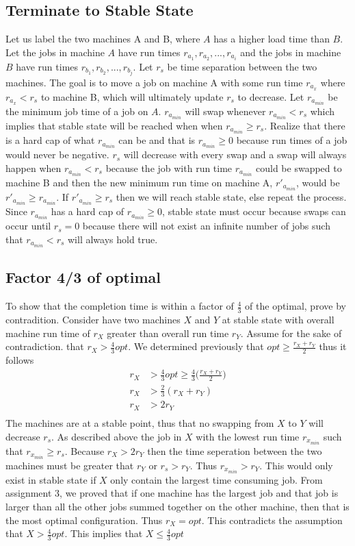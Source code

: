 \documentclass[11pt]{article}
\begin{document}
\subsection*{Terminate to Stable State}
 Let us label the two machines A and B, where $A$ has a higher load time than $B$. Let the jobs in machine $A$ have run times $r_{a_1}, r_{a_2}, ..., r_{a_i}$ and the jobs in machine $B$ have run times $r_{b_1}, r_{b_2}, ..., r_{b_j}$. Let $r_s$ be time separation between the two machines. The goal is to move a job on machine A with some run time $r_{a_x}$ where $r_{a_x} < r_s$ to machine B,  which will ultimately update $r_s$ to decrease. Let $r_{a_{min}}$ be the minimum job time of a job on $A$. $r_{a_{min}}$ will swap whenever $r_{a_{min}} < r_s$ which implies that stable state will be reached when when $r_{a_{min}} \geq r_s$. Realize that there is a hard cap of what $r_{a_{min}}$ can be and that is $r_{a_{min}} \geq 0$ because run times of a job would never be negative. $r_s$ will decrease with every swap and a swap will always happen when $r_{a_{min}} < r_s$ because the job with run time $r_{a_{min}}$ could be swapped to machine B and then the new minimum run time on machine A, $r'_{a_{min}}$, would be $r'_{a_{min}} \geq r_{a_{min}}$. If $r'_{a_{min}} \geq r_s$ then we will reach stable state, else repeat the process. Since $r_{a_{min}}$ has a hard cap of $r_{a_{min}}\geq 0$, stable state must occur because swaps can occur until $r_s = 0$ because there will not exist an infinite number of jobs such that $r_{a_{min}} < r_s$ will always hold true.

\subsection*{Factor 4/3 of optimal}
To show that the completion time is within a factor of $\frac{4}{3}$ of the optimal, prove by contradition. Consider have two machines $X$ and $Y$ at stable state with overall machine run time of $r_X$ greater than overall run time $r_Y$. Assume for the sake of contradiction. that $r_X > \frac{4}{3} opt$. We determined previously that $opt \geq \frac{r_X+r_Y}{2}$ thus it follows
\begin{align*}
r_X&>\frac{4}{3} opt \geq \frac{4}{3}\bigg(\frac{r_X+r_Y}{2}\bigg)\\
r_X&> \frac{2}{3}(r_X+r_Y)\\
r_X&>2r_Y \\
\end{align*}
The machines are at a stable point, thus that no swapping from $X$ to $Y$ will decrease $r_s$. As described above the job in $X$ with the lowest run time $r_{x_{min}}$ such that $r_{x_{min}} \geq r_s$. Because $r_X>2r_Y$ then the time seperation between the two machines must be greater that $r_Y$ or $r_s>r_Y$. Thus $r_{x_{min}} > r_Y$. This would only exist in stable state if $X$ only contain the largest time consuming job. From assignment 3, we proved that if one machine has the largest job and that job is larger than all the other jobs summed together on the other machine, then that is the most optimal configuration. Thus $r_X = opt$. This contradicts the assumption that $X>\frac{4}{3}opt$. This implies that $X \leq \frac{4}{3}opt$
\end{document}
